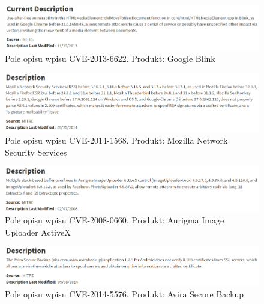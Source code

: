\documentclass[a4paper,12pt,twoside]{article}
\begin{document}
\begin{figure}[h]
    \centering
    \includegraphics[width=1.0\textwidth]{image/010CVE20136622.png}
    \caption{Pole opisu wpisu CVE-2013-6622. Produkt: Google Blink}
\end{figure}

\begin{figure}[h]
    \centering
    \includegraphics[width=1.0\textwidth]{image/011CVE20141568.png}
    \caption{Pole opisu wpisu CVE-2014-1568. Produkt: Mozilla Network Security Services}
\end{figure}

\begin{figure}[h]
    \centering
    \includegraphics[width=1.0\textwidth]{image/012CVE20080660.png}
    \caption{Pole opisu wpisu CVE-2008-0660. Produkt: Aurigma Image Uploader ActiveX}
\end{figure}

\begin{figure}[h]
    \centering
    \includegraphics[width=1.0\textwidth]{image/013CVE20145576.png}
    \caption{Pole opisu wpisu CVE-2014-5576. Produkt: Avira Secure Backup}
\end{figure}







\newpage
\end{document}
